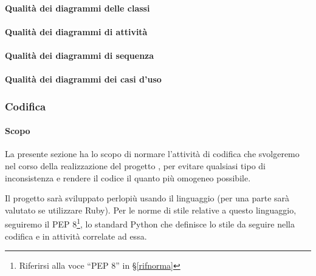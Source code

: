 		\paragraph{Qualità dei diagrammi delle classi} %

		\paragraph{Qualità dei diagrammi di attività} %

		\paragraph{Qualità dei diagrammi di sequenza} %

		\paragraph{Qualità dei diagrammi dei casi d'uso} %



		\subsubsection{Codifica}\label{PP:Sviluppo:Codifica}

		\paragraph{Scopo}
		La presente sezione ha lo scopo di normare l'attività di codifica che svolgeremo nel corso della realizzazione del progetto \progetto, per
		evitare qualsiasi tipo di inconsistenza e rendere il codice il quanto più omogeneo possibile.

		Il progetto sarà sviluppato perlopiù usando il linguaggio  (per una parte sarà valutato se utilizzare Ruby).
		Per le norme di stile relative a questo linguaggio, seguiremo il PEP 8\footnote{Riferirsi alla voce ``PEP 8'' in \S\ref{rifnorma}},
		lo standard Python che definisce lo stile da seguire nella codifica e in attività correlate ad essa.

